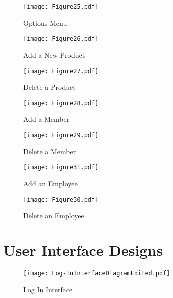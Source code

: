 \begin{figure}[H]
\caption{Options Menu} \label{fig:Options Menu}
\hfill\texttt{[image: Figure25.pdf]}\hspace*{\fill}
\end{figure}
\pagebreak

\begin{landscape}
\begin{figure}[H]
\caption{Add a New Product} \label{fig:Add a New Product}
\hfill\texttt{[image: Figure26.pdf]}\hspace*{\fill}
\end{figure}
\pagebreak

\begin{figure}[H]
\caption{Delete a Product} \label{fig:Delete a Product}
\hfill\texttt{[image: Figure27.pdf]}\hspace*{\fill}
\end{figure}
\pagebreak

\begin{figure}[H]
\caption{Add a Member} \label{fig:Add a Member}
\hfill\texttt{[image: Figure28.pdf]}\hspace*{\fill}
\end{figure}
\pagebreak

\begin{figure}[H]
\caption{Delete a Member} \label{fig:Delete a Member}
\hfill\texttt{[image: Figure29.pdf]}\hspace*{\fill}
\end{figure}
\pagebreak

\begin{figure}[H]
\caption{Add an Employee} \label{fig:Add an Employee}
\hfill\texttt{[image: Figure31.pdf]}\hspace*{\fill}
\end{figure}
\pagebreak

\begin{figure}[H]
\caption{Delete an Employee} \label{fig:Delete an Employee}
\hfill\texttt{[image: Figure30.pdf]}\hspace*{\fill}
\end{figure}
\pagebreak

\end{landscape}
\section{User Interface Designs}


\begin{figure}[H]
\caption{Log In Interface} \label{fig: Log In Interface}
\hfill\texttt{[image: Log-InInterfaceDiagramEdited.pdf]}\hspace*{\fill}
\end{figure}


